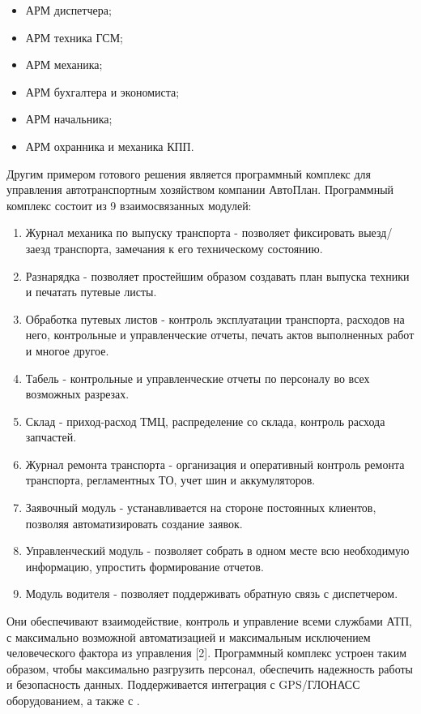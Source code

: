 \documentclass{lstu-diploma}
\begin{document}
\begin{itemize}
	\item АРМ диспетчера;
	\item АРМ техника ГСМ;
	\item АРМ механика;
	\item АРМ бухгалтера и экономиста;
	\item АРМ начальника;
	\item АРМ охранника и механика КПП.
\end{itemize}

Другим примером готового решения является программный комплекс для управления
автотранспортным хозяйством  компании АвтоПлан. Программный
комплекс состоит из 9 взаимосвязанных модулей:
\begin{enumerate}
	\item Журнал механика по выпуску транспорта - позволяет фиксировать
		выезд/заезд транспорта, замечания к его техническому состоянию.
	\item Разнарядка - позволяет простейшим образом создавать план выпуска
		техники и печатать путевые листы.
	\item Обработка путевых листов - контроль эксплуатации транспорта,
		расходов на него, контрольные и управленческие отчеты, печать актов
		выполненных работ и многое другое.
	\item Табель - контрольные и управленческие отчеты по персоналу во всех
		возможных разрезах.
	\item Склад - приход-расход ТМЦ, распределение со склада, контроль расхода
		запчастей.
	\item Журнал ремонта транспорта - организация и оперативный контроль
		ремонта транспорта, регламентных ТО, учет шин и аккумуляторов.
	\item Заявочный модуль - устанавливается на стороне постоянных клиентов,
		позволяя автоматизировать создание заявок.
	\item Управленческий модуль - позволяет собрать в одном месте всю
		необходимую информацию, упростить формирование отчетов.
	\item Модуль водителя - позволяет поддерживать обратную связь с
		диспетчером.
\end{enumerate}

Они обеспечивают взаимодействие, контроль и управление всеми службами АТП, с
максимально возможной автоматизацией и максимальным исключением человеческого
фактора из управления [2].
Программный комплекс устроен таким образом, чтобы максимально разгрузить
персонал, обеспечить надежность работы и безопасность данных.
Поддерживается интеграция с GPS/ГЛОНАСС оборудованием, а также с
.
\end{document}
